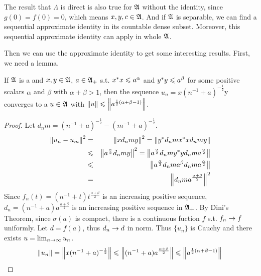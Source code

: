 \documentclass[a4paper,11pt]{report}
\begin{document}
\begin{rem}
	The result that $\Lambda$ is direct is also true for $\mathfrak{A}$ without the identity, since $g(0)=f(0)=0$, which means $x, y, c \in \mathfrak{A}$. And if $\mathfrak{A}$ is separable, we can find a sequential approximate identity in its countable dense subset. Moreover, this sequential approximate identity can apply in whole $\mathfrak{A}$.
\end{rem}

Then we can use the approximate identity to get some interesting results. First, we need a lemma.

\begin{lem}
	If $\mathfrak{A}$ is a \Cs and $x,y \in \mathfrak{A}$, $a \in \mathfrak{A}_{+}$ s.t. $x^{*}x \leqslant a^{\alpha}$ and $y^{*}y \leqslant a^{\beta}$ for some positive scalars $\alpha$ and $\beta$ with $\alpha + \beta > 1$, then the sequence $u_n = x(n^{-1}+a)^{-\frac{1}{2}}$y converges to a $u \in \mathfrak{A}$ with $\left\lVert u\right\lVert \leqslant \left\lVert a^{\frac{1}{2}(\alpha+\beta-1)}\right\lVert$.
\end{lem}
\begin{proof}
	Let $d_nm = (n^{-1}+a)^{-\frac{1}{2}}-(m^{-1}+a)^{-\frac{1}{2}}$.
	\begin{eqnarray*}
		\left\lVert u_n-u_m\right\lVert^2 &=& \left\lVert xd_nmy\right\lVert^2 = \left\lVert y^{*}d_nmx^{*}xd_nmy\right\lVert \\
		&\leqslant& \left\lVert a^{\frac{\alpha}{2}}d_nmy\right\lVert^2 = \left\lVert a^{\frac{\alpha}{2}}d_nmy^{*}yd_nma^{\frac{\alpha}{2}}\right\lVert \\
		&\leqslant& \left\lVert a^{\frac{\alpha}{2}}d_nm a^{\beta} d_nma^{\frac{\alpha}{2}}\right\lVert \\
		&=& \left\lVert d_nm a^{\frac{\alpha+\beta}{2}}\right\lVert^2
	\end{eqnarray*}
	Since $f_n(t) = (n^{-1}+t)t^{\frac{\alpha+\beta}{2}}$ is an increasing positive sequence, $d_n=(n^{-1}+a)a^{\frac{\alpha+\beta}{2}}$ is an increasing positive sequence in $\mathfrak{A}_{+}$. By Dini's Theorem, since $\sigma(a)$ is compact, there is a continuous fuction $f$ s.t. $f_n \rightarrow f$ uniformly. Let $d = f(a)$, thus $d_n \rightarrow d$ in norm. Thus $\{u_n\}$ is Cauchy and there exists $u = \lim_{n \rightarrow \infty} u_n$.
	\begin{equation*}
		\left\lVert u_n\right\lVert = \left\lVert x(n^{-1}+a)^{-\frac{1}{2}}\right\lVert \leqslant \left\lVert(n^{-1}+a)a^{\frac{\alpha+\beta}{2}}\right\lVert \leqslant \left\lVert a^{\frac{1}{2}(\alpha+\beta-1)}\right\lVert \qedhere
	\end{equation*}
\end{proof}
\end{document}

